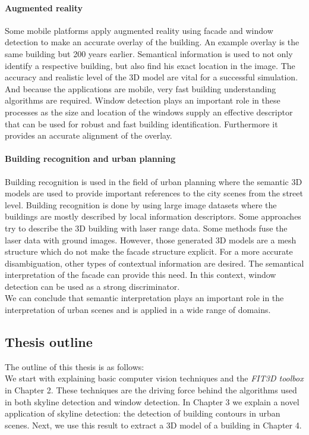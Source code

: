 \paragraph{Augmented reality}
	Some mobile platforms apply augmented reality using facade and window
	detection to make an accurate overlay of the building. An example overlay is
	the same building but 200 years earlier.  Semantical information is used to
	not only identify a respective building, but also find his exact location in
	the image.  The accuracy and realistic level of the 3D model are vital for a
	successful simulation.  And because the applications are mobile, very fast
	building understanding algorithms are required.  Window detection plays an
	important role in these processes as the size and location of the windows
	supply an effective descriptor that can be used for robust and fast building
	identification.  Furthermore it provides an accurate alignment of the
	overlay.

\paragraph{Building recognition and urban planning}
	Building recognition is used in the field of urban planning where the
	semantic 3D models are used to provide important references to the city
	scenes from the street level.  Building recognition is done by using large
	image datasets where the buildings are mostly described by local information
	descriptors.  Some approaches try to describe the 3D building with laser
	range data. Some methods fuse the laser data with ground images. However,
	those generated 3D models are a mesh structure which do not make the facade
	structure explicit.  For a more accurate disambiguation, other types of
	contextual information are desired.  The semantical interpretation of the
	facade can provide this need.  In this context, window detection can be used
	as a strong discriminator.\\

We can conclude that semantic interpretation plays an important role in the
interpretation of urban scenes and is applied in a wide range of domains.  

\newpage
\subsection{Thesis outline}
The outline of this thesis is as follows:\\ 

We start with explaining basic computer vision techniques and the \emph{FIT3D toolbox} in Chapter 2.  
These techniques are the driving
force behind the algorithms used in both skyline detection and window detection.  
In Chapter 3 we explain a novel application of skyline detection: the detection
of building contours in urban scenes. Next, we use this result to
extract a 3D model of a building in Chapter 4.

